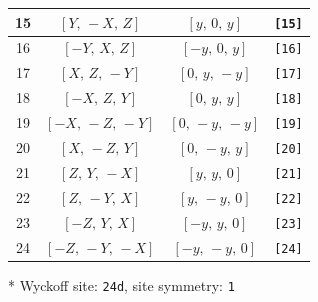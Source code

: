 \documentclass[fleqn,8pt]{jsarticle}
\begin{document}
\begin{longtable}{cccc}
15 & $\left[ Y,\, - X,\, Z \right]$ & $\left[ y,\, 0,\, y \right]$ & {\tt [15]} \\ \hline
16 & $\left[ - Y,\, X,\, Z \right]$ & $\left[ - y,\, 0,\, y \right]$ & {\tt [16]} \\ \hline
17 & $\left[ X,\, Z,\, - Y \right]$ & $\left[ 0,\, y,\, - y \right]$ & {\tt [17]} \\ \hline
18 & $\left[ - X,\, Z,\, Y \right]$ & $\left[ 0,\, y,\, y \right]$ & {\tt [18]} \\ \hline
19 & $\left[ - X,\, - Z,\, - Y \right]$ & $\left[ 0,\, - y,\, - y \right]$ & {\tt [19]} \\ \hline
20 & $\left[ X,\, - Z,\, Y \right]$ & $\left[ 0,\, - y,\, y \right]$ & {\tt [20]} \\ \hline
21 & $\left[ Z,\, Y,\, - X \right]$ & $\left[ y,\, y,\, 0 \right]$ & {\tt [21]} \\ \hline
22 & $\left[ Z,\, - Y,\, X \right]$ & $\left[ y,\, - y,\, 0 \right]$ & {\tt [22]} \\ \hline
23 & $\left[ - Z,\, Y,\, X \right]$ & $\left[ - y,\, y,\, 0 \right]$ & {\tt [23]} \\ \hline
24 & $\left[ - Z,\, - Y,\, - X \right]$ & $\left[ - y,\, - y,\, 0 \right]$ & {\tt [24]} \\
\end{longtable}
* Wyckoff site: {\tt 24d}, site symmetry: {\tt 1}
\renewcommand{\arraystretch}{1.2}
\end{document}

